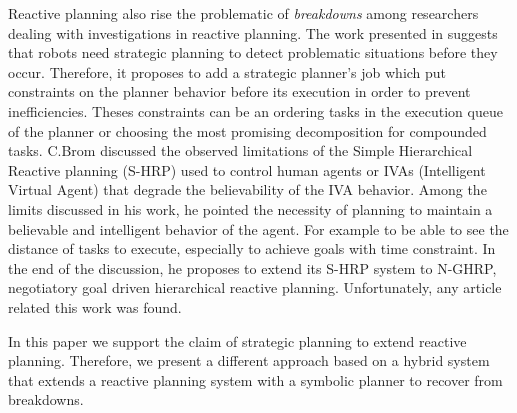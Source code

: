 \documentclass{llncs}
\begin{document}
		\par Reactive planning also rise the problematic  of \emph{breakdowns} among researchers dealing with investigations in reactive planning. The work presented in  \cite{firby1987investigation} suggests that robots need strategic planning to detect problematic situations before they occur. Therefore, it proposes to add a strategic planner's job which put constraints on the planner behavior before its execution in order to prevent inefficiencies. Theses constraints can be an ordering tasks in the execution queue of the planner or choosing the most promising decomposition for compounded tasks.
		C.Brom \cite{brom2005hierarchical} discussed the observed limitations of the  Simple Hierarchical Reactive planning (S-HRP) used to control human agents or IVAs (Intelligent Virtual Agent) that degrade the believability of the IVA behavior. Among the limits discussed in his work, he pointed  the necessity of planning to maintain a believable and intelligent behavior of the agent. For example to be able to see the distance of tasks to execute, especially to achieve goals with time constraint. In the end of the discussion, he proposes to extend its S-HRP system to N-GHRP, negotiatory goal driven hierarchical reactive planning. Unfortunately, any article related this work was found.   
		\par In this paper we support the claim of strategic planning to extend reactive planning. Therefore, we present a different approach based on a hybrid system that extends a reactive planning system with a symbolic planner to recover from breakdowns. 
	
\end{document}
